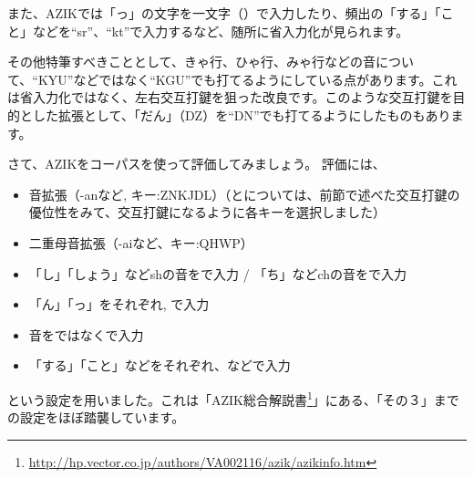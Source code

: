 また、AZIKでは「っ」の文字を一文字（\key{;}）で入力したり、頻出の「する」「こと」などを``sr''、``kt''で入力するなど、随所に省入力化が見られます。

その他特筆すべきこととして、きゃ行、ひゃ行、みゃ行などの音について、``KYU''などではなく``KGU''でも打てるようにしている点があります。これは省入力化ではなく、左右交互打鍵を狙った改良です。このような交互打鍵を目的とした拡張として、「だん」（DZ）を``DN''でも打てるようにしたものもあります。

さて、AZIKをコーパスを使って評価してみましょう。
評価には、
\begin{itemize}
 \item {}音拡張（-anなど, キー:ZNKJDL）（とについては、前節で述べた交互打鍵の優位性をみて、交互打鍵になるように各キーを選択しました）
 \item 二重母音拡張（-aiなど、キー:QHWP）
 \item 「し」「しょう」などshの音をで入力 / 「ち」などchの音をで入力
 \item 「ん」「っ」をそれぞれ, \key{;}で入力
 \item {}音をではなくで入力
 \item 「する」「こと」などをそれぞれ、などで入力
\end{itemize}
という設定を用いました。これは「AZIK総合解説書\footnote{\url{http://hp.vector.co.jp/authors/VA002116/azik/azikinfo.htm}}」にある、「その３」までの設定をほぼ踏襲しています。


